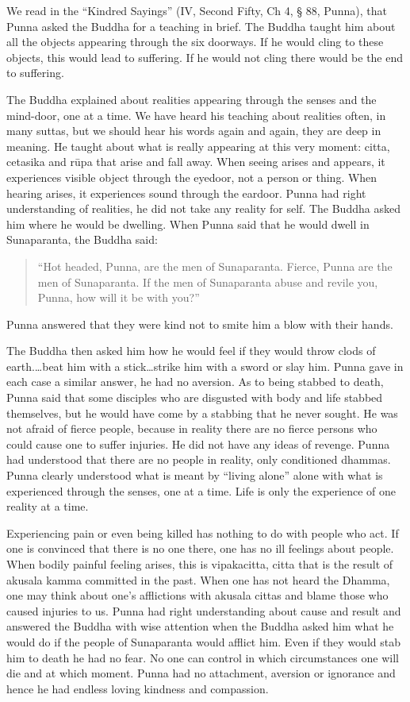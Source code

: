 We read in the ``Kindred Sayings'' (IV, Second Fifty, Ch 4, § 88, Punna), that Punna 
asked the Buddha for a teaching in brief. The Buddha taught him about all the objects 
appearing through the six doorways. If he would cling to these objects, this would 
lead to suffering. If he would not cling there would be the end to suffering. 

The Buddha explained about realities appearing through the senses and the mind-door, one at a time. We have heard his teaching about realities often, in many suttas, 
but we should hear his words again and again, they are deep in meaning. He taught 
about what is really appearing at this very moment: citta, cetasika and rūpa that arise 
and fall away. When seeing arises and appears, it experiences visible object through 
the eyedoor, not a person or thing. When hearing arises, it experiences sound through 
the eardoor. Punna had right understanding of realities, he did not take any reality for 
self. The Buddha asked him where he would be dwelling. When Punna said that he 
would dwell in Sunaparanta, the Buddha said: 

\begin{quote}

``Hot headed, Punna, are the men of Sunaparanta. Fierce, Punna are 
the men of Sunaparanta. If the men of Sunaparanta abuse and revile 
you, Punna, how will it be with you?'' 
\end{quote}

Punna answered that they were kind not to smite him a blow with their hands. 

The Buddha then asked him how he would feel if they would throw clods of 
earth.\ldots beat him with a stick\ldots strike him with a sword or slay him. Punna gave in each 
case a similar answer, he had no aversion. As to being stabbed to death, Punna said 
that some disciples who are disgusted with body and life stabbed themselves, but he 
would have come by a stabbing that he never sought. He was not afraid of fierce people, because in reality there are no fierce persons who could cause one to suffer injuries. He did not have any ideas of revenge. Punna had understood that there are no 
people in reality, only conditioned dhammas. Punna clearly understood what is meant 
by ``living alone'' alone with what is experienced through the senses, one at a time. 
Life is only the experience of one reality at a time. 

Experiencing pain or even being killed has nothing to do with people who act. If one 
is convinced that there is no one there, one has no ill feelings about people. When 
bodily painful feeling arises, this is vipakacitta, citta that is the result of akusala 
kamma committed in the past. When one has not heard the Dhamma, one may think 
about one’s afflictions with akusala cittas and blame those who caused injuries to us. 
Punna had right understanding about cause and result and answered the Buddha with 
wise attention when the Buddha asked him what he would do if the people of 
Sunaparanta would afflict him. Even if they would stab him to death he had no fear. 
No one can control in which circumstances one will die and at which moment. Punna 
had no attachment, aversion or ignorance and hence he had endless loving kindness 
and compassion. 

